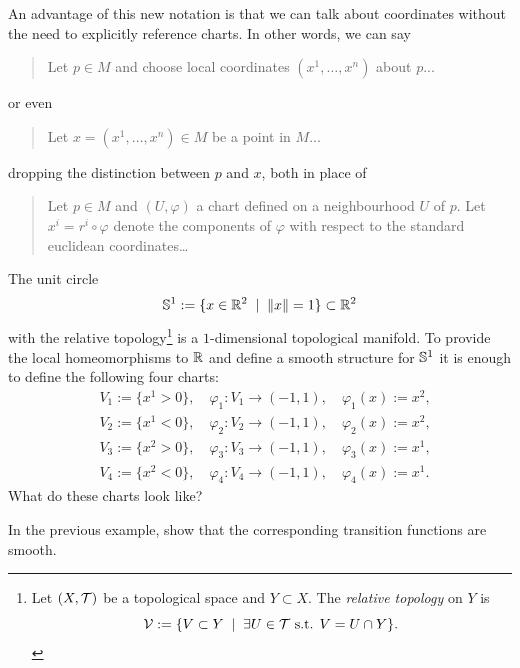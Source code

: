 An advantage of this new notation is that we can talk about coordinates without the need to explicitly reference charts. In other words, we can say
\begin{quote}
  Let $p\in M$ and choose local coordinates $(x^1, \ldots, x^n)$ about $p$...
\end{quote}
or even
\begin{quote}
  Let $x=(x^1, \ldots, x^n)\in M$ be a point in $M$...
\end{quote}
dropping the distinction between $p$ and $x$, both in place of
\begin{quote}
  Let $p \in M$ and $(U, \varphi)$ a chart defined on a neighbourhood $U$ of $p$.
  Let $x^i = r^i \circ\varphi$ denote the components of $\varphi$ with respect to the standard euclidean coordinates\ldots
\end{quote}

\begin{example}\label{ex:S1emb}
  The unit circle
  \begin{equation}
    \mathbb{S}^1 := \{x\in\mathbb{R}^2 \;\mid\; \|x\|=1\}\subset\mathbb{R}^2
  \end{equation}
  with the relative topology\footnote{Let $(X,\mathcal{T})$ be a topological space and $Y\subset X$. The \emph{relative topology} on $Y$ is \begin{equation}\mathcal{V}:=\{V\subset Y\;\mid\;\exists U\in\mathcal{T} \mbox{ s.t. } V = U \cap Y\}.\end{equation}} is a $1$-dimensional topological manifold.
  To provide the local homeomorphisms to $\mathbb{R}$ and define a smooth structure for $\mathbb{S}^1$ it is enough to define the following four charts:
  \begin{equation}
    \begin{aligned}
       & V_1 := \{ x^1 > 0 \},\quad \varphi_1: V_1 \to (-1, 1), \quad \varphi_1(x) := x^2, \\
       & V_2 := \{ x^1 < 0 \},\quad \varphi_2: V_2 \to (-1, 1), \quad \varphi_2(x) := x^2, \\
       & V_3 := \{ x^2 > 0 \},\quad \varphi_3: V_3 \to (-1, 1), \quad \varphi_3(x) := x^1, \\
       & V_4 := \{ x^2 < 0 \},\quad \varphi_4: V_4 \to (-1, 1), \quad \varphi_4(x) := x^1.
    \end{aligned}
  \end{equation}
  What do these charts look like?
\end{example}
\begin{exercise}
  In the previous example, show that the corresponding transition functions are smooth.
\end{exercise}

